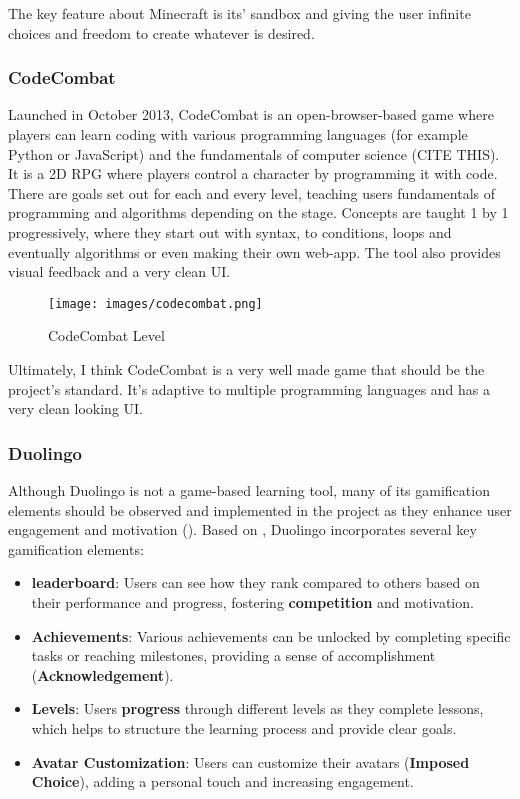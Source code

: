 The key feature about Minecraft is its' sandbox and giving the user infinite choices and freedom to create whatever is desired.

\subsubsection{CodeCombat}
Launched in October 2013, CodeCombat is an open-browser-based game where players can learn coding with various programming languages (for example Python or JavaScript) and the fundamentals of computer science (CITE THIS). It is a 2D RPG where players control a character by programming it with code. There are goals set out for each and every level, teaching users fundamentals of programming and algorithms depending on the stage. Concepts are taught 1 by 1 progressively, where they start out with syntax, to conditions, loops and eventually algorithms or even making their own web-app. The tool also provides visual feedback and a very clean UI.

\begin{figure}[H]
    \centering
    \texttt{[image: images/codecombat.png]}
    \caption{CodeCombat Level}
\end{figure}
Ultimately, I think CodeCombat is a very well made game that should be the project's standard. It's adaptive to multiple programming languages and has a very clean looking UI.

\subsubsection{Duolingo}
Although Duolingo is not a game-based learning tool, many of its gamification elements should be observed and implemented in the project as they enhance user engagement and motivation (\cite{mekler2017towards}). Based on \cite{toda2019analysing}, Duolingo incorporates several key gamification elements:
\begin{itemize}
    \item \textbf{leaderboard}: Users can see how they rank compared to others based on their performance and progress, fostering \textbf{competition} and motivation.
    \item \textbf{Achievements}: Various achievements can be unlocked by completing specific tasks or reaching milestones, providing a sense of accomplishment (\textbf{Acknowledgement}).
    \item \textbf{Levels}: Users \textbf{progress} through different levels as they complete lessons, which helps to structure the learning process and provide clear goals.
    \item \textbf{Avatar Customization}: Users can customize their avatars (\textbf{Imposed Choice}), adding a personal touch and increasing engagement.
\end{itemize}

